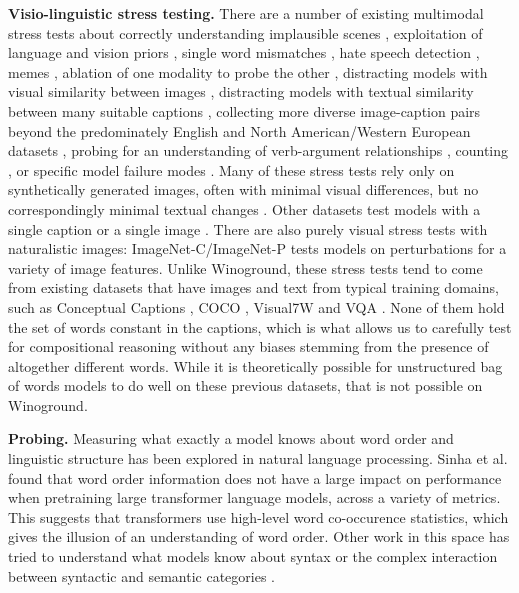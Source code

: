 \documentclass[10pt,twocolumn,letterpaper]{article}
\begin{document}
\textbf{Visio-linguistic stress testing.} There are a number of existing multimodal stress tests about correctly understanding implausible scenes \cite{choi2012context}, exploitation of language and vision priors \cite{chao2017being, goyal2017making}, single word mismatches \cite{shekhar2017foil}, hate speech detection \cite{hosseinmardi2015detection,zhong2016content,gomez2020exploring, kirk2021hatemoji}, memes \cite{kiela2020hateful,suryawanshi2021trollmeme}, ablation of one modality to probe the other \cite{frank-etal-2021-vision}, distracting models with visual similarity between images \cite{hu2019evaluating, bogin2021covr}, distracting models with textual similarity between many suitable captions \cite{ding2016understanding, akula2020words}, collecting more diverse image-caption pairs beyond the predominately English and North American/Western European datasets \cite{liu-etal-2021-visually}, probing for an understanding of verb-argument relationships \cite{hendricks2021probing}, counting \cite{parcalabescu2021seeing}, or specific model failure modes \cite{singh2019towards,sidorov2020textcaps}. Many of these stress tests rely only on synthetically generated images, often with minimal visual differences, but no correspondingly minimal textual changes \cite{vedantam2021curi}. Other datasets test models with a single caption \cite{suhr2017corpus} or a single image \cite{johnson2017clevr, bitton-etal-2021-automatic}. There are also purely visual stress tests with naturalistic images: ImageNet-C/ImageNet-P \cite{hendrycks2019robustness} tests models on perturbations for a variety of image features.  Unlike Winoground, these stress tests tend to come from existing datasets that have images and text from typical training domains, such as Conceptual Captions \cite{sharma2018conceptual}, COCO \cite{lin2014microsoft}, Visual7W \cite{zhu2016visual7w} and VQA \cite{antol2015vqa,goyal2017making}. None of them hold the set of words constant in the captions, which is what allows us to carefully test for compositional reasoning without any biases stemming from the presence of altogether different words. While it is theoretically possible for unstructured bag of words models to do well on these previous datasets, that is not possible on Winoground.

\textbf{Probing.} Measuring what exactly a model knows about word order and linguistic structure has been explored in natural language processing. Sinha et al. \cite{sinha2021matterslittle} found that word order information does not have a large impact on performance when pretraining large transformer language models, across a variety of metrics. This suggests that transformers use high-level word co-occurence statistics, which gives the illusion of an understanding of word order. Other work in this space has tried to understand what models know about syntax \cite{linzen2016assessing, gulordava2018, williams-etal-2018-latent, hu-etal-2020-systematic, gauthier-etal-2020-syntaxgym,  sinha-etal-2021-unnatural, parthasarathi-etal-2021-sometimes-want} or the complex interaction between syntactic and semantic categories \cite{kann-etal-2019-verb,warstadt-etal-2019-investigating,thrush2020investigating, warstadt-etal-2020-blimp-benchmark}.
\end{document}
